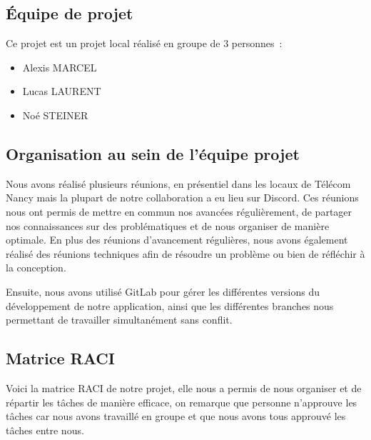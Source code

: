 \documentclass[french,a4paper]{article}
\begin{document}
    \subsection{Équipe de projet}\label{subsec:equipe-de-projet}
    Ce projet est un projet local réalisé en groupe de 3 personnes~:
    \begin{itemize}
        \item Alexis MARCEL
        \item Lucas LAURENT
        \item Noé STEINER
    \end{itemize}

    \subsection{Organisation au sein de l’équipe projet}\label{subsec:organisation-au-sein-de-lequipe-projet}
    Nous avons réalisé plusieurs réunions, en présentiel dans les locaux de Télécom Nancy mais la plupart de notre collaboration a eu lieu sur Discord.
    Ces réunions nous ont permis de mettre en commun nos avancées régulièrement, de partager nos connaissances sur des problématiques et de nous organiser de manière optimale.
    En plus des réunions d'avancement régulières, nous avons également réalisé des réunions techniques afin de résoudre un problème ou bien de réfléchir à la conception.

    Ensuite, nous avons utilisé GitLab pour gérer les différentes versions du développement de notre application, ainsi que les différentes
    branches nous permettant de travailler simultanément sans conflit.

    \subsection{Matrice RACI}\label{subsec:matrice-raci}
    Voici la matrice RACI de notre projet, elle nous a permis de nous organiser et de répartir les tâches de manière efficace, on remarque que personne n'approuve les tâches car nous avons travaillé en groupe et que nous avons tous approuvé les tâches entre nous.
\end{document}
